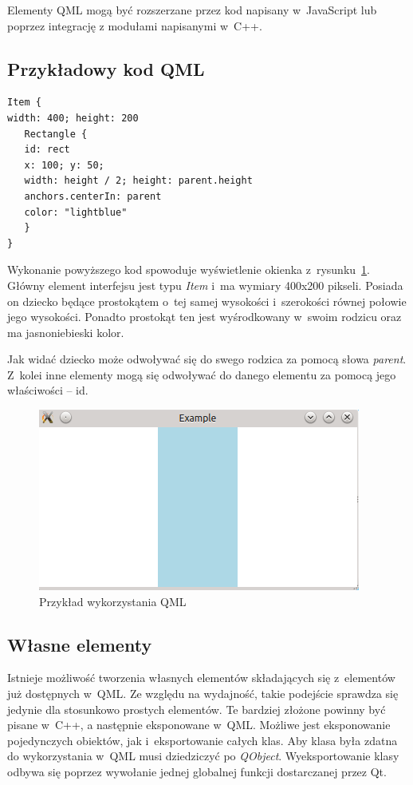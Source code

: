 Elementy QML mogą być rozszerzane przez kod napisany w~JavaScript lub poprzez integrację z modułami napisanymi w~C++.

\subsection{Przykładowy kod QML}

\begin{verbatim}
Item {
width: 400; height: 200
   Rectangle {
   id: rect
   x: 100; y: 50;
   width: height / 2; height: parent.height
   anchors.centerIn: parent
   color: "lightblue"
   }
}
\end{verbatim}

Wykonanie powyższego kod spowoduje wyświetlenie okienka z~rysunku~\ref{rys:qml}. Główny element interfejsu jest typu \textit{Item} i~ma wymiary 400x200 pikseli. Posiada on dziecko będące prostokątem o~tej samej wysokości i~szerokości równej połowie jego wysokości. Ponadto prostokąt ten jest wyśrodkowany w~swoim rodzicu oraz ma jasnoniebieski kolor.

Jak widać dziecko może odwoływać się do swego rodzica za pomocą słowa \textit{parent}. Z~kolei inne elementy mogą się odwoływać do danego elementu za pomocą jego właściwości -- id.

\begin{figure}
\centering
\caption{Przykład wykorzystania QML}\label{rys:qml}
\includegraphics{img/qml.png}
\end{figure}

\subsection{Własne elementy}
Istnieje możliwość tworzenia własnych elementów składających się z~elementów już dostępnych w~QML. Ze względu na wydajność, takie podejście sprawdza się jedynie dla stosunkowo prostych elementów. Te bardziej złożone powinny być pisane w~C++, a następnie eksponowane w~QML. Możliwe jest eksponowanie pojedynczych obiektów, jak i~eksportowanie całych klas. Aby klasa była zdatna do wykorzystania w~QML musi dziedziczyć po \textit{QObject}. Wyeksportowanie klasy odbywa się poprzez wywołanie jednej globalnej funkcji dostarczanej przez Qt.

